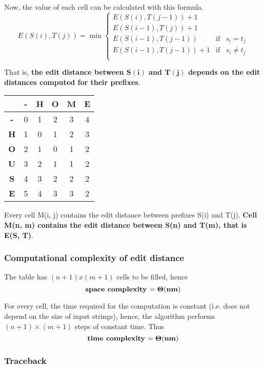 \documentclass[../main.tex]{subfiles}
\begin{document}
Now, the value of each cell can be calculated with this formula.
$$
E(S(i), T(j)) = \min \left\{\begin{array}{rcl}
E(S(i), T(j-1)) + 1 \\ 
E(S(i-1), T(j)) + 1 \\
E(S(i-1), T(j-1)) & \mbox{if} & s_i = t_j \\
E(S(i-1), T(j-1)) +1 & \mbox{if} & s_i \neq t_j \\
\end{array}
\right.
$$

That is, \textbf{the edit distance between $\mathbf{S(i)}$ and $\mathbf{T(j)}$ depends on the edit distances computed for their prefixes}.

\begin{center}
\begin{tabular}{|c|c|c|c|c|c|}
\hline
& \textbf{-} & \textbf{H} & \textbf{O} & \textbf{M} & \textbf{E} \\
\hline
\textbf{-} & 0 & 1 & 2 & 3 & 4 \\
\hline
\textbf{H} & 1 & 0 & 1 & 2 & 3 \\
\hline
\textbf{O} & 2 & 1 & 0 & 1 & 2 \\
\hline
\textbf{U} & 3 & 2 & 1 & 1 & 2 \\
\hline
\textbf{S} & 4 & 3 & 2 & 2 & 2 \\
\hline
\textbf{E} & 5 & 4 & 3 & 3 & \cellcolor[gray]{0.9}2 \\
\hline
\end{tabular}
\end{center}

Every cell M(i, j) contains the edit distance between prefixes S(i) and T(j). \textbf{Cell M(n, m) contains the edit distance between S(n) and T(m), that is E(S, T)}.

\subsubsection{Computational complexity of edit distance}

The table has $(n + 1) x (m + 1)$ cells to be filled, hence
$$
\mbox{\textbf{space complexity }} \mathbf{= \Theta(nm)}
$$

For every cell, the time required for the computation is constant (i.e. does not depend on the size of input strings), hence, the algorithm performs $(n+1)\times(m+1)$ steps of constant time. Thus
$$
\mbox{\textbf{time complexity }} \mathbf{= \Theta(nm)}
$$

\subsubsection{Traceback}
\end{document}
